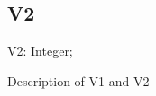 \documentclass{report}
\begin{document}
\subsection*{V2}
\begin{list}{}{
\setlength{\itemindent}{0cm}
\setlength{\listparindent}{0cm}
\setlength{\leftmargin}{\evensidemargin}
\addtolength{\leftmargin}{\tmplength}
\settowidth{\labelsep}{X}
\addtolength{\leftmargin}{\labelsep}
\setlength{\labelwidth}{\tmplength}
}
\begin{flushleft}
\item[\textbf{Declaration}\hfill]
\begin{ttfamily}
V2: Integer;\end{ttfamily}


\end{flushleft}
\par
\item[\textbf{Description}]
Description of V1 and V2

\end{list}
\end{document}
